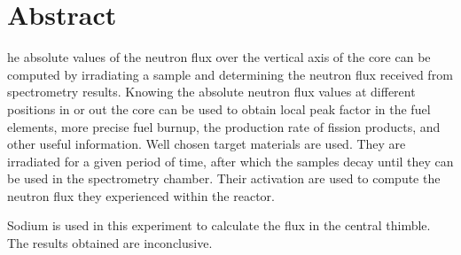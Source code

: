 %
%
%

\chapter*{Abstract}
\begin{SingleSpace}
he absolute values of the neutron flux over the vertical axis of the core can be computed by irradiating a sample and determining the neutron flux received from spectrometry results. Knowing the absolute neutron flux values at different positions in or out the core can be used to obtain local peak factor in the fuel elements, more precise fuel burnup, the production rate of fission products, and other useful information. Well chosen target materials are used. They are irradiated for a given period of time, after which the samples decay until they can be used in the spectrometry chamber. Their activation are used to compute the neutron flux they experienced within the reactor.

Sodium is used in this experiment to calculate the flux in the central thimble. The results obtained are inconclusive.

\end{SingleSpace}
\clearpage
